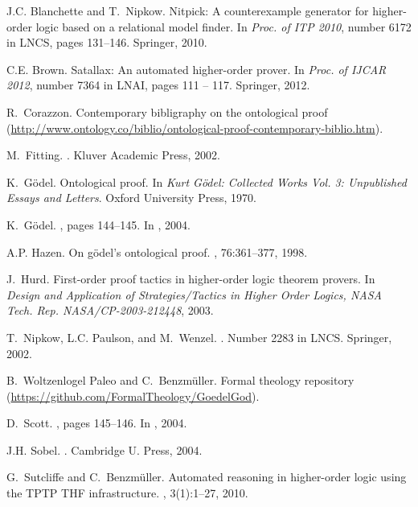 \documentclass{llncs}
\begin{document}
\begin{thebibliography}{10}
J.C. Blanchette and T.~Nipkow.
\newblock Nitpick: A counterexample generator for higher-order logic based on a
  relational model finder.
\newblock In {\em Proc. of ITP 2010}, number 6172 in LNCS, pages 131--146.
  Springer, 2010.

C.E. Brown.
\newblock Satallax: An automated higher-order prover.
\newblock In {\em Proc. of IJCAR 2012}, number 7364 in LNAI, pages 111 -- 117.
  Springer, 2012.

R.~Corazzon.
\newblock Contemporary bibligraphy on the ontological proof
  (\url{http://www.ontology.co/biblio/ontological-proof-contemporary-biblio.htm}).

M.~Fitting.
.
\newblock Kluver Academic Press, 2002.

K.~G\"odel.
\newblock Ontological proof.
\newblock In {\em {Kurt G\"odel: Collected Works Vol. 3: Unpublished Essays and
  Letters}}. Oxford University Press, 1970.

K.~G\"odel.
, pages 144--145.
\newblock In  \cite{sobel2004logic}, 2004.

A.P. Hazen.
\newblock On g\"odel's ontological proof.
, 76:361--377, 1998.

J.~Hurd.
\newblock First-order proof tactics in higher-order logic theorem provers.
\newblock In {\em Design and Application of Strategies/Tactics in Higher Order
  Logics, NASA Tech. Rep. NASA/CP-2003-212448}, 2003.

T.~Nipkow, L.C. Paulson, and M.~Wenzel.
.
\newblock Number 2283 in LNCS. Springer, 2002.

B.~Woltzenlogel Paleo and C.~Benzm\"uller.
\newblock Formal theology repository
  (\url{https://github.com/FormalTheology/GoedelGod}).

D.~Scott.
, pages 145--146.
\newblock In  \cite{sobel2004logic}, 2004.

J.H. Sobel.
.
\newblock Cambridge U. Press, 2004.

G.~Sutcliffe and C.~Benzm{\"u}ller.
\newblock Automated reasoning in higher-order logic using the {TPTP THF}
  infrastructure.
, 3(1):1--27, 2010.

\end{thebibliography}
\end{document}
